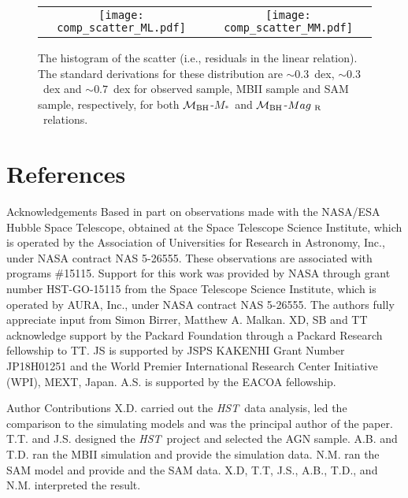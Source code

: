 \documentclass{natureprintstyle}
\newcommand{\hst}{{\it HST}}
\newcommand{\mbh}{$\mathcal M_{\rm BH}$}
\newcommand{\mr}{$Mag_{\rm ~R}$}
\newcommand{\mstar}{{$M_*$}}
\begin{document}
\begin{figure*}[t]%
\begin{tabular}{c c}
\texttt{[image: comp\_scatter\_ML.pdf]} &
\texttt{[image: comp\_scatter\_MM.pdf]} \\
\end{tabular}
\caption{The histogram of the scatter (i.e., residuals in the linear relation). The standard derivations for these distribution are $\sim0.3$~dex, $\sim0.3$~dex and $\sim0.7$~dex for observed sample, MBII sample and SAM sample, respectively, for both \mbh-\mstar\ and \mbh-\mr\ relations.
}
\label{fig:offset_comp}
\end{figure*}


\section*{References}
 


\begin{addendum}
 \item[Acknowledgements] 
Based in part on observations made with the NASA/ESA Hubble Space Telescope, obtained at the Space Telescope Science Institute, which is operated by the Association of Universities for Research in Astronomy, Inc., under NASA contract NAS 5-26555. These observations are associated with programs \#15115. Support for this work was provided by NASA through grant number HST-GO-15115 from the Space Telescope Science Institute, which is operated by AURA, Inc., under NASA contract NAS 5-26555. The authors fully appreciate input from Simon Birrer, Matthew A. Malkan. XD, SB and TT acknowledge support by the Packard Foundation through a Packard Research fellowship to TT. JS is supported by JSPS KAKENHI Grant Number JP18H01251 and the World Premier International Research Center Initiative (WPI), MEXT, Japan. A.S. is supported by the EACOA fellowship.

%
\item[Author Contributions] X.D. carried out the \hst\ data analysis, led the comparison to the simulating models and was the principal author of the paper. T.T. and J.S. designed the \hst\ project and selected the AGN sample. A.B. and T.D. ran the MBII simulation and provide the simulation data. N.M. ran the SAM model and provide and the SAM data. X.D, T.T, J.S., A.B., T.D., and N.M. interpreted the result.

\end{addendum}
\end{document}
